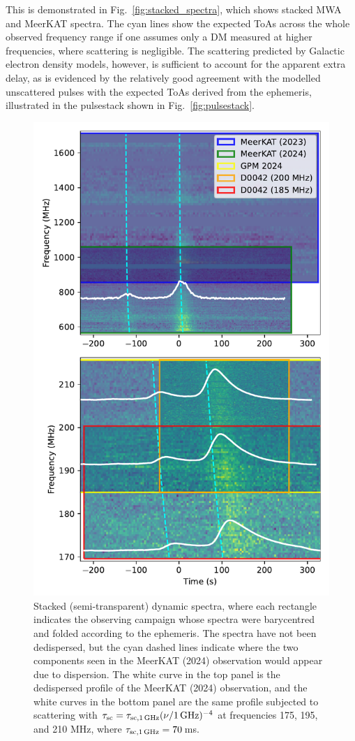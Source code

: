 \documentclass[fleqn,usenatbib]{mnras}
\newcommand{\Fig}{Fig.}
\begin{document}
This is demonstrated in \Fig~\ref{fig:stacked_spectra}, which shows stacked MWA and MeerKAT spectra.
The cyan lines show the expected ToAs across the whole observed frequency range if one assumes only a DM measured at higher frequencies, where scattering is negligible.
The scattering predicted by Galactic electron density models, however, is sufficient to account for the apparent extra delay, as is evidenced by the relatively good agreement with the modelled unscattered pulses with the expected ToAs derived from the ephemeris, illustrated in the pulsestack shown in \Fig~\ref{fig:pulsestack}.

\begin{figure}
      \centering
          \includegraphics[width=0.95\linewidth]{stacked_spectra.pdf}
              \caption{Stacked (semi-transparent) dynamic spectra, where each rectangle indicates the observing campaign whose spectra were barycentred and folded according to the ephemeris. The spectra have not been dedispersed, but the cyan dashed lines indicate where the two components seen in the MeerKAT (2024) observation would appear due to dispersion. The white curve in the top panel is the dedispersed profile of the MeerKAT (2024) observation, and the white curves in the bottom panel are the same profile subjected to scattering with $\tau_{\rm sc} = \tau_{\rm sc,1\,GHz} (\nu/{\rm 1\,GHz})^{-4}$ at frequencies 175, 195, and 210 MHz, where $\tau_{\rm sc,1\,GHz} = 70$\,ms.}

\end{figure}
\end{document}
